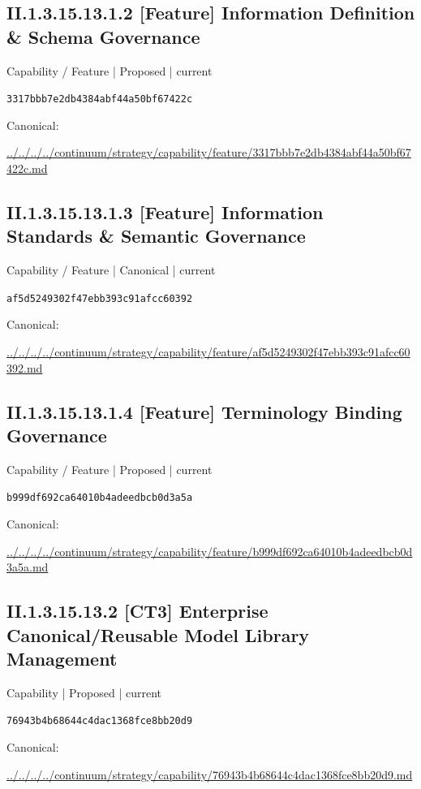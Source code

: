 \documentclass[10pt,a4paper]{article}
\begin{document}
\subsection*{II.1.3.15.13.1.2 [Feature] Information Definition \& Schema Governance}
{\small Capability / Feature | Proposed | current}\par
\texttt{3317bbb7e2db4384abf44a50bf67422c}\par
Canonical: \par
{\footnotesize\url{../../../../continuum/strategy/capability/feature/3317bbb7e2db4384abf44a50bf67422c.md}}\par
\subsection*{II.1.3.15.13.1.3 [Feature] Information Standards \& Semantic Governance}
{\small Capability / Feature | Canonical | current}\par
\texttt{af5d5249302f47ebb393c91afcc60392}\par
Canonical: \par
{\footnotesize\url{../../../../continuum/strategy/capability/feature/af5d5249302f47ebb393c91afcc60392.md}}\par
\subsection*{II.1.3.15.13.1.4 [Feature] Terminology Binding Governance}
{\small Capability / Feature | Proposed | current}\par
\texttt{b999df692ca64010b4adeedbcb0d3a5a}\par
Canonical: \par
{\footnotesize\url{../../../../continuum/strategy/capability/feature/b999df692ca64010b4adeedbcb0d3a5a.md}}\par
\subsection*{II.1.3.15.13.2 [CT3] Enterprise Canonical/Reusable Model Library Management}
{\small Capability | Proposed | current}\par
\texttt{76943b4b68644c4dac1368fce8bb20d9}\par
Canonical: \par
{\footnotesize\url{../../../../continuum/strategy/capability/76943b4b68644c4dac1368fce8bb20d9.md}}\par
\end{document}
